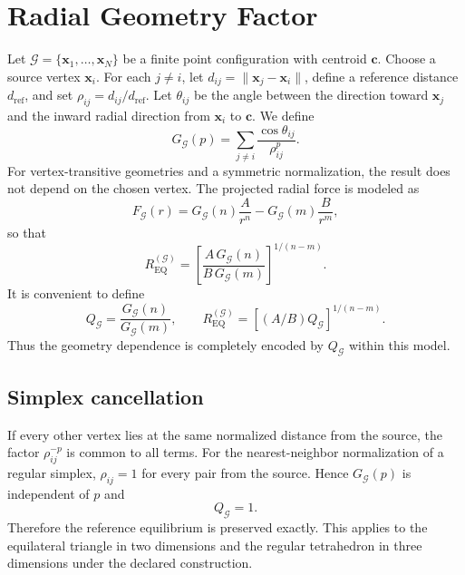 \documentclass[11pt]{article}
\begin{document}
\section{Radial Geometry Factor}
Let $\mathcal G=\{\mathbf x_1,\dots,\mathbf x_N\}$ be a finite point configuration with centroid $\mathbf c$. Choose a source vertex $\mathbf x_i$. For each $j\ne i$, let $d_{ij}=\|\mathbf x_j-\mathbf x_i\|$, define a reference distance $d_{\mathrm{ref}}$, and set $\rho_{ij}=d_{ij}/d_{\mathrm{ref}}$. Let $\theta_{ij}$ be the angle between the direction toward $\mathbf x_j$ and the inward radial direction from $\mathbf x_i$ to $\mathbf c$. We define
\begin{equation}
G_{\mathcal G}(p)=\sum_{j\ne i}\frac{\cos\theta_{ij}}{\rho_{ij}^{p}}.
\end{equation}
For vertex-transitive geometries and a symmetric normalization, the result does not depend on the chosen vertex. The projected radial force is modeled as
\begin{equation}
F_{\mathcal G}(r)=G_{\mathcal G}(n)\frac{A}{r^n}-G_{\mathcal G}(m)\frac{B}{r^m},
\end{equation}
so that
\begin{equation}
\boxed{R_{\mathrm{EQ}}^{(\mathcal G)}=\left[\frac{A\,G_{\mathcal G}(n)}{B\,G_{\mathcal G}(m)}\right]^{1/(n-m)}}.
\end{equation}
It is convenient to define
\begin{equation}
Q_{\mathcal G}=\frac{G_{\mathcal G}(n)}{G_{\mathcal G}(m)},
\qquad
R_{\mathrm{EQ}}^{(\mathcal G)}=\left[(A/B)Q_{\mathcal G}\right]^{1/(n-m)}.
\end{equation}
Thus the geometry dependence is completely encoded by $Q_{\mathcal G}$ within this model.

\subsection{Simplex cancellation}
If every other vertex lies at the same normalized distance from the source, the factor $\rho_{ij}^{-p}$ is common to all terms. For the nearest-neighbor normalization of a regular simplex, $\rho_{ij}=1$ for every pair from the source. Hence $G_{\mathcal G}(p)$ is independent of $p$ and
\begin{equation}
Q_{\mathcal G}=1.
\end{equation}
Therefore the reference equilibrium is preserved exactly. This applies to the equilateral triangle in two dimensions and the regular tetrahedron in three dimensions under the declared construction.
\end{document}
